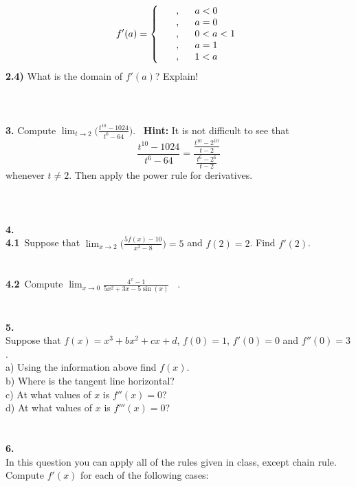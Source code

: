 \documentclass[12pt]{article}
\newcommand{\ds}{\displaystyle}
\newcommand{\Frac}{\displaystyle \frac}
\begin{document}
$$f'(a)=\left\{ \begin{array}{ll}
              \  \  \  \  , & \  \  \hbox{$a<0$}
              \\
               \  \  \  \ , & \  \  \hbox{$a=0$}
              \\
               \  \  \  \ , & \  \  \hbox{$0<a<1$}
              \\
                \  \  \  \ , & \  \  \hbox{$a=1$}
              \\
                \  \  \  \ , &  \  \  \hbox{$1<a$}
                \end{array}
            \right. $$
\textbf{2.4)} What is the domain of $f'(a)$? Explain!
\\\\\\\\
\textbf{3.} Compute $\ds\lim_{t\to
2}\big(\Frac{t^{10}-1024}{t^{6}-64}\big)$. \ \textbf{Hint:} It is
not difficult to see that
$$\Frac{t^{10}-1024}{t^{6}-64}=\Frac{\frac{t^{10}-2^{10}}{t-2}}{\frac{t^{6}-2^{6}}{t-2}}$$
whenever $t\neq 2$. Then apply the power rule for derivatives.
\\\\\\\\
\textbf{4.}\\
\textbf{4.1}\ Suppose that $\ds\lim_{x\to 2}
\big(\Frac{5f(x)-10}{x^{3}-8}\big)=5$ and $f(2)=2$. Find $f'(2)$.\\
\\
\\
\textbf{4.2}\ Compute $\ds\lim_{x\to
0}\Frac{4^{x}-1}{5x^{2}+3x-5\sin(x)}$ \ .
\\\\\\
\textbf{5.}\\
Suppose that $f(x)=x^{3}+bx^{2}+cx+d$, $f(0)=1$, $f'(0)=0$ and
$f''(0)=3$.
\\
a) Using the information above find $f(x)$.\\
b) Where is the tangent line horizontal?\\
c) At what values of $x$ is $f''(x)=0$?\\
d) At what values of $x$ is $f'''(x)=0$?\\
\\
\\
\textbf{6.}\\
In this question you can apply all of the rules given in class,
except chain rule.
Compute $f'(x)$ for each of the following cases:\\
\end{document}
